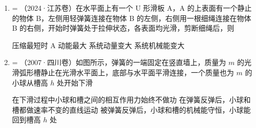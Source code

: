 \documentclass[\gkver]{gaokaozhenti}
\makeatletter
\newcommand{\tiinfo}[2]{{\small\color{gray}（#1）\textcolor{orange!85!black}{\nandu{#2}}}\hspace{0.4em}}
\newenvironment{tibody}
  {\begin{minipage}[t]{\linewidth}\@listdepth=\@ne\leavevmode\ignorespaces}
  {\end{minipage}}
\makeatother
\begin{document}
\begin{enumerate}[resume=tiku]
\item
\begin{tibody}
\tiinfo{2024·江苏卷}{2}在水平面上有一个 U 形滑板 A，A 的上表面有一个静止的物体 B，左侧用轻弹簧连接在物体 B 的左侧，右侧用一根细绳连接在物体 B 的右侧，开始时弹簧处于拉伸状态，各表面均光滑，剪断细绳后，则


{压缩最短时 A 动能最大}
{系统动量变大}
{系统机械能变大}
\end{tibody}


\item
\begin{tibody}
\tiinfo{2007·四川卷}{2}如图所示，弹簧的一端固定在竖直墙上，质量为 $m$ 的光滑弧形槽静止在光滑水平面上，底部与水平面平滑连接，一个质量也为 $m$ 的小球从槽高 $h$ 处开始下滑


{在下滑过程中小球和槽之间的相互作用力始终不做功}
{在弹簧反弹后，小球和槽都做速率不变的直线运动}
{被弹簧反弹后，小球和槽的机械能守恒，小球能回到槽高 $h$ 处}
\end{tibody}


\end{enumerate}
\end{document}

